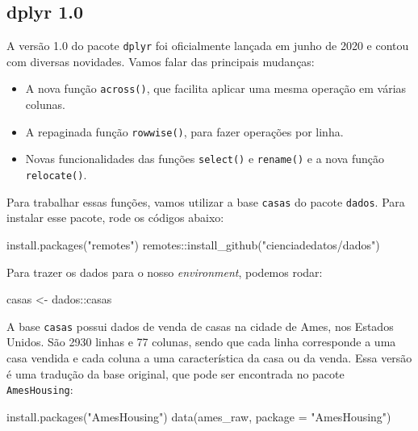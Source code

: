 \documentclass[
]{book}
\newenvironment{Shaded}{\begin{snugshade}}{\end{snugshade}}
\newcommand{\AttributeTok}[1]{\textcolor[rgb]{0.77,0.63,0.00}{#1}}
\newcommand{\FunctionTok}[1]{\textcolor[rgb]{0.00,0.00,0.00}{#1}}
\newcommand{\NormalTok}[1]{#1}
\newcommand{\OtherTok}[1]{\textcolor[rgb]{0.56,0.35,0.01}{#1}}
\newcommand{\SpecialCharTok}[1]{\textcolor[rgb]{0.00,0.00,0.00}{#1}}
\newcommand{\StringTok}[1]{\textcolor[rgb]{0.31,0.60,0.02}{#1}}
\begin{document}
\hypertarget{dplyr-1.0}{%
\subsection{dplyr 1.0}\label{dplyr-1.0}}

A versão 1.0 do pacote \texttt{dplyr} foi oficialmente lançada em junho de 2020 e contou com diversas novidades. Vamos falar das principais mudanças:

\begin{itemize}
\item
  A nova função \texttt{across()}, que facilita aplicar uma mesma operação em várias colunas.
\item
  A repaginada função \texttt{rowwise()}, para fazer operações por linha.
\item
  Novas funcionalidades das funções \texttt{select()} e \texttt{rename()} e a nova função \texttt{relocate()}.
\end{itemize}

Para trabalhar essas funções, vamos utilizar a base \texttt{casas} do pacote \texttt{dados}. Para instalar esse pacote, rode os códigos abaixo:

\begin{Shaded}
\begin{Highlighting}[]
\FunctionTok{install.packages}\NormalTok{(}\StringTok{"remotes"}\NormalTok{)}
\NormalTok{remotes}\SpecialCharTok{::}\FunctionTok{install\_github}\NormalTok{(}\StringTok{"cienciadedatos/dados"}\NormalTok{)}
\end{Highlighting}
\end{Shaded}

Para trazer os dados para o nosso \emph{environment}, podemos rodar:

\begin{Shaded}
\begin{Highlighting}[]
\NormalTok{casas }\OtherTok{\textless{}{-}}\NormalTok{ dados}\SpecialCharTok{::}\NormalTok{casas}
\end{Highlighting}
\end{Shaded}

A base \texttt{casas} possui dados de venda de casas na cidade de Ames, nos Estados Unidos. São 2930 linhas e 77 colunas, sendo que cada linha corresponde a uma casa vendida e cada coluna a uma característica da casa ou da venda. Essa versão é uma tradução da base original, que pode ser encontrada no pacote \texttt{AmesHousing}:

\begin{Shaded}
\begin{Highlighting}[]
\FunctionTok{install.packages}\NormalTok{(}\StringTok{"AmesHousing"}\NormalTok{)}
\FunctionTok{data}\NormalTok{(ames\_raw, }\AttributeTok{package =} \StringTok{"AmesHousing"}\NormalTok{)}
\end{Highlighting}
\end{Shaded}
\end{document}
